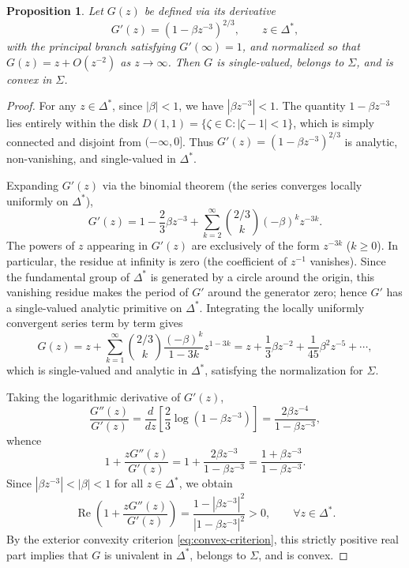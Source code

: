 \documentclass[11pt,reqno]{amsart}
\newtheorem{proposition}[theorem]{Proposition}
\theoremstyle{definition}
\renewcommand{\Re}{\operatorname{Re}}
\begin{document}
\begin{proposition}\label{prop:G}
Let $G(z)$ be defined via its derivative
\begin{equation}\label{eq:def-Gprime}
G'(z) = (1 - \beta z^{-3})^{2/3}, \qquad z \in \Delta^*,
\end{equation}
with the principal branch satisfying $G'(\infty) = 1$, and normalized so that $G(z) = z + O(z^{-2})$ as $z \to \infty$. Then $G$ is single-valued, belongs to $\Sigma$, and is convex in $\Sigma$.
\end{proposition}
\begin{proof}
For any $z \in \Delta^*$, since $|\beta| < 1$, we have $|\beta z^{-3}| < 1$. The quantity $1 - \beta z^{-3}$ lies entirely within the disk $D(1, 1) = \{\zeta \in \mathbb{C} : |\zeta - 1| < 1\}$, which is simply connected and disjoint from $(-\infty, 0]$. Thus $G'(z) = (1 - \beta z^{-3})^{2/3}$ is analytic, non-vanishing, and single-valued in $\Delta^*$.

Expanding $G'(z)$ via the binomial theorem (the series converges locally uniformly on $\Delta^*$),
\begin{equation}
G'(z) = 1 - \frac{2}{3}\beta z^{-3} + \sum_{k=2}^\infty \binom{2/3}{k} (-\beta)^k z^{-3k}.
\end{equation}
The powers of $z$ appearing in $G'(z)$ are exclusively of the form $z^{-3k}$ ($k \ge 0$). In particular, the residue at infinity is zero (the coefficient of $z^{-1}$ vanishes). Since the fundamental group of $\Delta^*$ is generated by a circle around the origin, this vanishing residue makes the period of $G'$ around the generator zero; hence $G'$ has a single-valued analytic primitive on $\Delta^*$. Integrating the locally uniformly convergent series term by term gives
\begin{equation}
G(z) = z + \sum_{k=1}^\infty \binom{2/3}{k} \frac{(-\beta)^k}{1 - 3k} z^{1 - 3k} = z + \frac{1}{3}\beta z^{-2} + \frac{1}{45}\beta^2 z^{-5} + \cdots,
\end{equation}
which is single-valued and analytic in $\Delta^*$, satisfying the normalization for $\Sigma$.

Taking the logarithmic derivative of $G'(z)$,
\begin{equation}
\frac{G''(z)}{G'(z)} = \frac{d}{dz}\left[\frac{2}{3}\log(1 - \beta z^{-3})\right] = \frac{2\beta z^{-4}}{1 - \beta z^{-3}},
\end{equation}
whence
\begin{equation}
1 + \frac{z G''(z)}{G'(z)} = 1 + \frac{2\beta z^{-3}}{1 - \beta z^{-3}} = \frac{1 + \beta z^{-3}}{1 - \beta z^{-3}}.
\end{equation}
Since $|\beta z^{-3}| < |\beta| < 1$ for all $z \in \Delta^*$, we obtain
\begin{equation}
\Re\left(1 + \frac{z G''(z)}{G'(z)}\right) = \frac{1 - |\beta z^{-3}|^2}{|1 - \beta z^{-3}|^2} > 0, \qquad \forall z \in \Delta^*.
\end{equation}
By the exterior convexity criterion \eqref{eq:convex-criterion}, this strictly positive real part implies that $G$ is univalent in $\Delta^*$, belongs to $\Sigma$, and is convex.
\end{proof}
\end{document}

